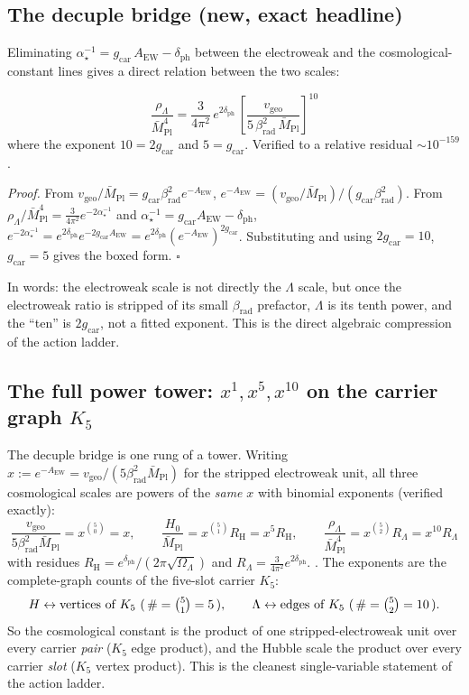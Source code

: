 \documentclass[11pt,a4paper]{article}
\newcommand{\Mbar}{\bar M_{\mathrm{Pl}}}
\newcommand{\gcar}{g_{\mathrm{car}}}
\newcommand{\dph}{\delta_{\mathrm{ph}}}
\newcommand{\betarad}{\beta_{\mathrm{rad}}}
\newcommand{\ainv}{\alpha^{-1}_\star}
\newcommand{\AEW}{A_{\mathrm{EW}}}
\theoremstyle{definition}
\begin{document}
\subsection{The decuple bridge (new, exact headline)}

Eliminating $\ainv=\gcar\,\AEW-\dph$ between the electroweak and the cosmological-constant lines
gives a direct relation between the two scales:

\begin{keybox}
\begin{equation}
  \boxed{\ \frac{\rho_\Lambda}{\Mbar^4}
  =\frac{3}{4\pi^2}\,e^{2\dph}\,
  \left[\frac{v_{\mathrm{geo}}}{5\,\betarad^2\,\Mbar}\right]^{10}\ }
\end{equation}
where the exponent $10=2\gcar$ and $5=\gcar$. Verified to a relative residual $\sim10^{-159}$.
\end{keybox}

\noindent\emph{Proof.} From $v_{\mathrm{geo}}/\Mbar=\gcar\betarad^2 e^{-\AEW}$,
$e^{-\AEW}=(v_{\mathrm{geo}}/\Mbar)/(\gcar\betarad^2)$. From
$\rho_\Lambda/\Mbar^4=\tfrac{3}{4\pi^2}e^{-2\ainv}$ and $\ainv=\gcar\AEW-\dph$,
$e^{-2\ainv}=e^{2\dph}e^{-2\gcar\AEW}=e^{2\dph}(e^{-\AEW})^{2\gcar}$. Substituting and using
$2\gcar=10$, $\gcar=5$ gives the boxed form. $\square$

\smallskip
In words: the electroweak scale is not directly the $\Lambda$ scale, but once the electroweak ratio
is stripped of its small $\betarad$ prefactor, $\Lambda$ is its tenth power, and the ``ten'' is
$2\gcar$, not a fitted exponent. This is the direct algebraic compression of the action ladder.

\subsection{The full power tower: $x^{1},x^{5},x^{10}$ on the carrier graph $K_5$}

The decuple bridge is one rung of a tower. Writing $x:=e^{-\AEW}=v_{\mathrm{geo}}/(5\betarad^2\Mbar)$
for the stripped electroweak unit, all three cosmological scales are powers of the \emph{same} $x$
with binomial exponents (verified exactly):
\begin{equation}
  \boxed{\ \frac{v_{\mathrm{geo}}}{5\betarad^2\Mbar}=x^{\binom50}=x,\qquad
  \frac{H_0}{\Mbar}=x^{\binom51}R_{\mathrm H}=x^5R_{\mathrm H},\qquad
  \frac{\rho_\Lambda}{\Mbar^4}=x^{\binom52}R_\Lambda=x^{10}R_\Lambda\ }
\end{equation}
with residues $R_{\mathrm H}=e^{\dph}/(2\pi\sqrt{\Omega_\Lambda})$ and $R_\Lambda=\tfrac{3}{4\pi^2}e^{2\dph}$.
\mE. The exponents are the complete-graph counts of the five-slot carrier $K_5$:
\[
  H \leftrightarrow \text{vertices of }K_5\ (\,\#=\tbinom51=5\,),\qquad
  \Lambda \leftrightarrow \text{edges of }K_5\ (\,\#=\tbinom52=10\,).
\]
So the cosmological constant is the product of one stripped-electroweak unit over every carrier
\emph{pair} ($K_5$ edge product), and the Hubble scale the product over every carrier \emph{slot}
($K_5$ vertex product). This is the cleanest single-variable statement of the action ladder.
\end{document}
